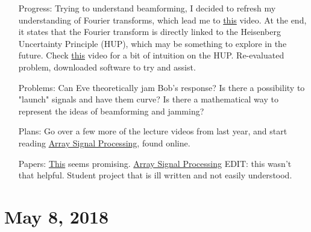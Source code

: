 \documentclass[11pt]{article}
\begin{document}
\begin{itemize}
\item[Progress:]
Trying to understand beamforming, I decided to refresh my understanding of Fourier transforms, which lead me to \href{https://www.youtube.com/watch?v=spUNpyF58BY}{this} video.  At the end, it states that the Fourier transform is directly linked to the Heisenberg Uncertainty Principle (HUP), which may be something to explore in the future.  Check \href{https://www.youtube.com/watch?v=MBnnXbOM5S4}{this} video for a bit of intuition on the HUP.  Re-evaluated problem, downloaded software to try and assist.

\item[Problems:]
Can Eve theoretically jam Bob's response?
Is there a possibility to "launch" signals and have them curve?\newline\newline
Is there a mathematical way to represent the ideas of beamforming and jamming?\newline\newline

\item[Plans:]
Go over a few more of the lecture videos from last year, and start reading \href{http://cnx.org/content/col10255/1.4/}{Array Signal Processing}, found online.

\item[Papers:]
\href{https://aip.scitation.org/doi/pdf/10.1063/1.5011063}{This} seems promising.
\href{http://cnx.org/content/col10255/1.4/}{Array Signal Processing} EDIT: this wasn't that helpful.  Student project that is ill written and not easily understood.

\end{itemize}

\section{May 8, 2018}
\end{document}
